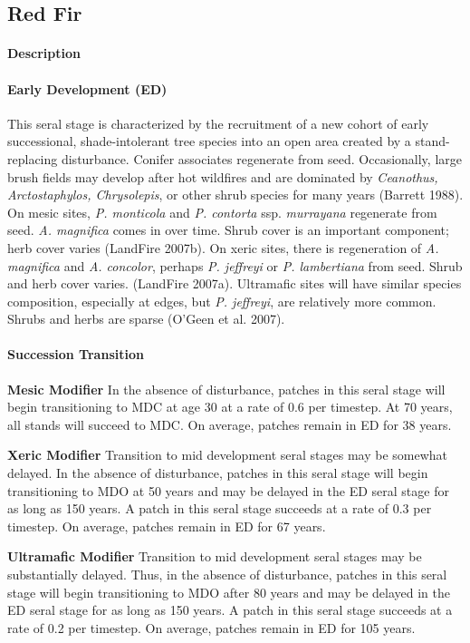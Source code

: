 \subsection*{Red Fir}

\paragraph{Description}
\paragraph{Early Development (ED)} This seral stage is characterized by the recruitment of a new cohort of early successional, shade-intolerant tree species into an open area created by a stand-replacing disturbance. Conifer associates regenerate from seed. Occasionally, large brush fields may develop after hot wildfires and are dominated by \emph{Ceanothus, Arctostaphylos, Chrysolepis}, or other shrub species for many years (Barrett 1988). On mesic sites, \emph{P. monticola} and \emph{P. contorta} ssp. \emph{murrayana} regenerate from seed. \emph{A. magnifica} comes in over time. Shrub cover is an important component; herb cover varies (LandFire 2007b). On xeric sites, there is regeneration of \emph{A. magnifica} and \emph{A. concolor}, perhaps \emph{P. jeffreyi} or \emph{P. lambertiana} from seed. Shrub and herb cover varies. (LandFire 2007a). Ultramafic sites will have similar species composition, especially at edges, but \emph{P. jeffreyi}, are relatively more common. Shrubs and herbs are sparse (O'Geen et al. 2007).

\paragraph{Succession Transition}

\begin{adjustwidth}{2cm}{}

\noindent \textbf{Mesic Modifier } In the absence of disturbance, patches in this seral stage will begin transitioning to MDC at age 30 at a rate of 0.6 per timestep. At 70 years, all stands will succeed to MDC. On average, patches remain in ED for 38 years.

\medskip
\noindent \textbf{Xeric Modifier}  Transition to mid development seral stages may be somewhat delayed. In the absence of disturbance, patches in this seral stage will begin transitioning to MDO at 50 years and may be delayed in the ED seral stage for as long as 150 years. A patch in this seral stage succeeds at a rate of 0.3 per timestep. On average, patches remain in ED for 67 years.

\medskip
\noindent \textbf{Ultramafic Modifier}  Transition to mid development seral stages may be substantially delayed. Thus, in the absence of disturbance, patches in this seral stage will begin transitioning to MDO after 80 years and may be delayed in the ED seral stage for as long as 150 years. A patch in this seral stage succeeds at a rate of 0.2 per timestep. On average, patches remain in ED for 105 years.

\end{adjustwidth}




